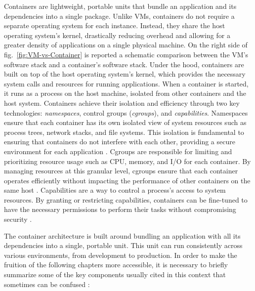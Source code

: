 Containers are lightweight, portable units that bundle an application and its
dependencies into a single package. Unlike VMs, containers do not require a
separate operating system for each instance.
Instead, they share the host operating system's kernel, drastically reducing
overhead and allowing for a greater density of applications on a single physical
machine. On the right side of fig.~\ref{fig:VM-vs-Container} is reported a
schematic comparison between the VM's software stack and a container's software
stack.
Under the hood, containers are built on top of the host operating system's
kernel, which provides the necessary system calls and resources for running
applications.
When a container is started, it runs as a process on the host machine, isolated
from other containers and the host system.
Containers achieve their isolation and efficiency through two key technologies:
\textit{namespaces}, control groups (\textit{cgroups}), and
\textit{capabilities}.
Namespaces ensure that each container has its own isolated view of system
resources such as process trees, network stacks, and file systems.
This isolation is fundamental to ensuring that containers do not interfere with
each other, providing a secure environment for each application \cite{kerris2021}.
Cgroups are responsible for limiting and prioritizing resource usage such as
CPU, memory, and I/O for each container.
By managing resources at this granular level, cgroups ensure that each container
operates efficiently without impacting the performance of other containers on
the same host \cite{cgroup-kerneldoc, ovens2020}.
Capabilities are a way to control a process's access to system resources.
By granting or restricting capabilities, containers can be fine-tuned to have the
necessary permissions to perform their tasks without compromising security
\cite{kerris2021}.

The container architecture is built around bundling an application with all its
dependencies into a single, portable unit. This unit can run consistently across
various environments, from development to production.
In order to make the fruition of the following chapters more accessible, it is
necessary to briefly summarize some of the key components usually cited in this
context that sometimes can be confused \cite{walsh2022, huawei2023}:

